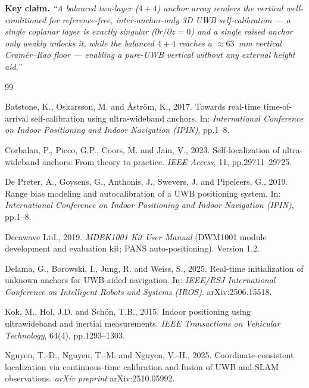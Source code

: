 \documentclass[11pt,a4paper]{article}
\begin{document}
\textbf{Key claim.} \emph{``A balanced two-layer
($4{+}4$) anchor array renders the vertical \emph{well-conditioned} for reference-free, inter-anchor-only 3D UWB
self-calibration --- a single coplanar layer is exactly singular ($\partial r/\partial z = 0$) and a single raised anchor only weakly unlocks it, while
the balanced $4{+}4$ reaches a ${\approx}63$~mm vertical Cram\'{e}r--Rao floor --- enabling a pure-UWB
vertical without any external height aid.''}

\begin{thebibliography}{99}

 Batstone, K., Oskarsson, M. and \AA{}str\"om, K.,
2017. Towards real-time time-of-arrival self-calibration using ultra-wideband anchors. In:
\emph{International Conference on Indoor Positioning and Indoor Navigation (IPIN)}, pp.1--8.

 Corbalan, P., Picco, G.P., Coors, M. and Jain, V.,
2023. Self-localization of ultra-wideband anchors: From theory to practice. \emph{IEEE Access}, 11,
pp.29711--29725.

 De Preter, A., Goysens, G., Anthonis, J., Swevers,
J. and Pipeleers, G., 2019. Range bias modeling and autocalibration of a UWB positioning system. In:
\emph{International Conference on Indoor Positioning and Indoor Navigation (IPIN)}, pp.1--8.

 Decawave Ltd., 2019. \emph{MDEK1001 Kit User Manual}
(DWM1001 module development and evaluation kit; PANS auto-positioning). Version 1.2.

 Delama, G., Borowski, I., Jung, R. and Weiss, S., 2025.
Real-time initialization of unknown anchors for UWB-aided navigation. In: \emph{IEEE/RSJ
International Conference on Intelligent Robots and Systems (IROS)}. arXiv:2506.15518.

 Kok, M., Hol, J.D. and Sch\"on, T.B., 2015. Indoor positioning
using ultrawideband and inertial measurements. \emph{IEEE Transactions on Vehicular Technology},
64(4), pp.1293--1303.

 Nguyen, T.-D., Nguyen, T.-M. and Nguyen, V.-H., 2025.
Coordinate-consistent localization via continuous-time calibration and fusion of UWB and SLAM
observations. \emph{arXiv preprint} arXiv:2510.05992.


\end{thebibliography}
\end{document}

